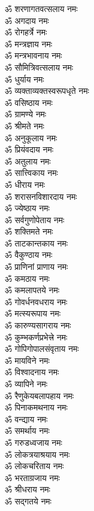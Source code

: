 \begin{multicols}{2}
\begin{flushleft}
ॐ शरणागतवत्सलाय नमः\\
ॐ अगदाय नमः\\
ॐ रोगहर्त्रे नमः\\
ॐ मन्त्रज्ञाय नमः\\
ॐ मन्त्रभावनाय नमः\\
ॐ सौमित्रिवत्सलाय नमः\\
ॐ धुर्याय नमः\\
ॐ व्यक्ताव्यक्तस्वरूपधृते नमः\\
ॐ वसिष्ठाय नमः\hfill{}\\
ॐ ग्रामण्ये नमः\\
ॐ श्रीमते नमः\\
ॐ अनुकूलाय नमः\\
ॐ प्रियंवदाय नमः\\
ॐ अतुलाय नमः\\
ॐ सात्त्विकाय नमः\\
ॐ धीराय नमः\\
ॐ शरासनविशारदाय नमः\\
ॐ ज्येष्ठाय नमः\\
ॐ सर्वगुणोपेताय नमः\hfill{}\\
ॐ शक्तिमते नमः\\
ॐ ताटकान्तकाय नमः\\
ॐ वैकुण्ठाय नमः\\
ॐ प्राणिनां प्राणाय नमः\\
ॐ कमठाय नमः\\
ॐ कमलापतये नमः\\
ॐ गोवर्धनवधराय नमः\\
ॐ मत्स्यरूपाय नमः\\
ॐ कारुण्यसागराय नमः\\
ॐ कुम्भकर्णप्रभेत्त्रे नमः\hfill{}\\
ॐ गोपिगोपालसंवृताय नमः\\
ॐ मायविने नमः\\
ॐ विश्वादनाय नमः\\
ॐ व्यापिने नमः\\
ॐ रैणुकेयबलापहाय नमः\\
ॐ पिनाकमथनाय नमः\\
ॐ वन्द्याय नमः\\
ॐ समर्थाय नमः\\
ॐ गरुडध्वजाय नमः\\
ॐ लोकत्रयाश्रयाय नमः\hfill{}\\
ॐ लोकचरिताय नमः\\
ॐ भरताग्रजाय नमः\\
ॐ श्रीधराय नमः\\
ॐ सद्गतये नमः\\

\end{flushleft}
\end{multicols}
